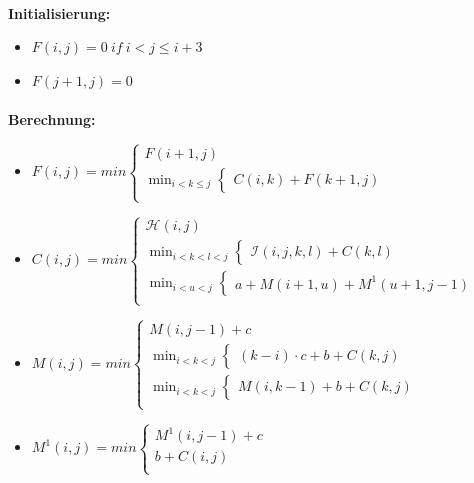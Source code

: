 \paragraph{}
\textbf{Initialisierung:}
\begin{itemize}
	\item[] $F(i,j)=0\ if \ i<j\le i+3$ 
	\item[] $F(j+1, j) = 0$
\end{itemize}
\paragraph{}
\textbf{Berechnung:}
\begin{itemize}
	\item[]$F(i,j)=min
			\begin{cases}
               F(i+1, j)\\
               \displaystyle\min_{i < k \le j} \begin{cases} C(i,k) + F(k+1, j) \end{cases}\\
			\end{cases}$

	\item[] $C(i,j) = min
		\begin{cases}
			\mathcal{H}(i,j)\\
			\displaystyle\min_{i < k < l < j} \begin{cases} \mathcal{I}(i,j,k,l) + C(k,l) \end{cases}\\
			\displaystyle\min_{i < u < j} \begin{cases} a + M(i+1, u) + M^1(u+1, j-1) \end{cases}\\
		\end{cases}$
	\item[] $M(i,j) = min
		\begin{cases}
			M(i,j-1) + c\\
			\displaystyle\min_{i < k < j} \begin{cases} (k-i) \cdot c + b + C(k,j)\end{cases}\\
			\displaystyle\min_{i < k < j} \begin{cases} M(i, k-1) + b + C(k,j)\end{cases}\\
		\end{cases}$
	\item[]$M^1(i,j) = min
		\begin{cases}
			M^1(i,j-1) + c\\
			b + C(i,j)\\
		\end{cases}$
\end{itemize}
